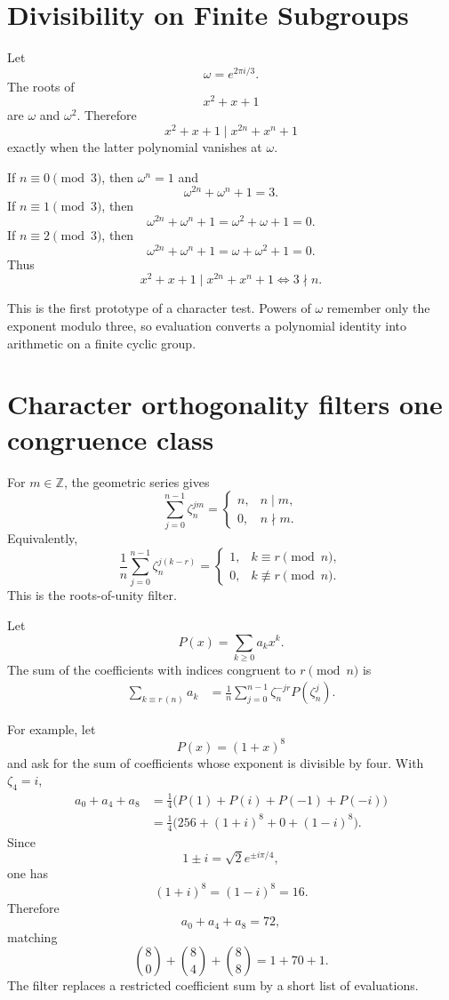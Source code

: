 \section{Divisibility on Finite Subgroups}

Let
\[
  \omega=e^{2\pi i/3}.
\]
The roots of
\[
  x^2+x+1
\]
are \(\omega\) and \(\omega^2\).  Therefore
\[
  x^2+x+1
  \mid
  x^{2n}+x^n+1
\]
exactly when the latter polynomial vanishes at \(\omega\).

If \(n\equiv0\pmod3\), then \(\omega^n=1\) and
\[
  \omega^{2n}+\omega^n+1=3.
\]
If \(n\equiv1\pmod3\), then
\[
  \omega^{2n}+\omega^n+1
  =\omega^2+\omega+1=0.
\]
If \(n\equiv2\pmod3\), then
\[
  \omega^{2n}+\omega^n+1
  =\omega+\omega^2+1=0.
\]
Thus
\[
  \boxed{
  x^2+x+1\mid x^{2n}+x^n+1
  \iff 3\nmid n.}
\]

This is the first prototype of a character test.  Powers of \(\omega\) remember only the exponent modulo three, so evaluation converts a polynomial identity into arithmetic on a finite cyclic group.

\section{Character orthogonality filters one congruence class}

For \(m\in\mathbb Z\), the geometric series gives
\[
  \sum_{j=0}^{n-1}\zeta_n^{jm}
  =
  \begin{cases}
    n,&n\mid m,\\
    0,&n\nmid m.
  \end{cases}
\]
Equivalently,
\[
  \frac1n
  \sum_{j=0}^{n-1}
  \zeta_n^{j(k-r)}
  =
  \begin{cases}
    1,&k\equiv r\pmod n,\\
    0,&k\not\equiv r\pmod n.
  \end{cases}
\]
This is the roots-of-unity filter.

Let
\[
  P(x)=\sum_{k\ge0}a_kx^k.
\]
The sum of the coefficients with indices congruent to \(r\pmod n\) is
\[
\begin{aligned}
  \sum_{k\equiv r\, (n)}a_k
  &=\frac1n
    \sum_{j=0}^{n-1}
    \zeta_n^{-jr}P(\zeta_n^j).
\end{aligned}
\]

For example, let
\[
  P(x)=(1+x)^8
\]
and ask for the sum of coefficients whose exponent is divisible by four.  With \(\zeta_4=i\),
\[
\begin{aligned}
  a_0+a_4+a_8
  &=\frac14\bigl(P(1)+P(i)+P(-1)+P(-i)\bigr)\\
  &=\frac14\bigl(256+(1+i)^8+0+(1-i)^8\bigr).
\end{aligned}
\]
Since
\[
  1\pm i=\sqrt2e^{\pm i\pi/4},
\]
one has
\[
  (1+i)^8=(1-i)^8=16.
\]
Therefore
\[
  a_0+a_4+a_8=72,
\]
matching
\[
  \binom80+\binom84+\binom88
  =1+70+1.
\]
The filter replaces a restricted coefficient sum by a short list of evaluations.

